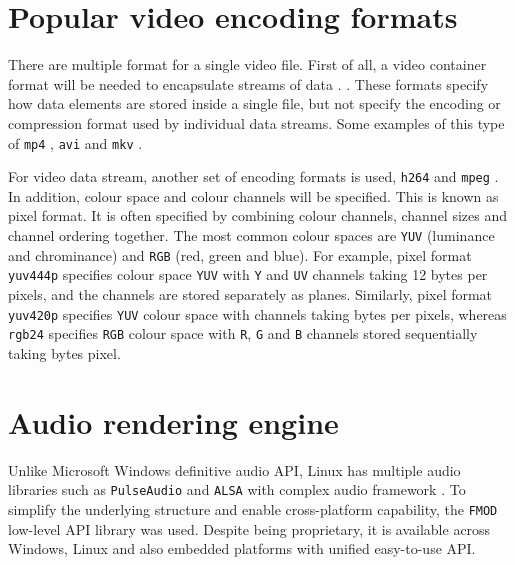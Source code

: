 \section{Popular video encoding formats}

There are multiple format  for a single video file. First of all, a video container format will be needed to encapsulate  streams of  data . . These formats specify how data elements are stored inside a single file, but  not specify the encoding or compression format used by individual data streams. Some examples of this type of   \texttt{mp4} \cite{mp4}, \texttt{avi} \cite{avi} and \texttt{mkv} \cite{mkv}.

For  video data stream, another set of encoding formats is used,  \texttt{h264} \cite{h264} and \texttt{mpeg} \cite{mpeg}. In addition, colour space and colour channels will  be specified. This is known as  pixel format. It is often specified by combining colour channels, channel sizes and channel ordering together. The  most common colour spaces are \texttt{YUV} (luminance and chrominance) and \texttt{RGB} (red, green and blue). For example, pixel format \texttt{yuv444p} specifies colour space \texttt{YUV} with \texttt{Y} and \texttt{UV} channels taking 12 bytes per  pixels, and the channels are stored separately as planes. Similarly, pixel format \texttt{yuv420p} specifies \texttt{YUV} colour space with channels taking  bytes per  pixels, whereas \texttt{rgb24} specifies \texttt{RGB} colour space with \texttt{R}, \texttt{G} and \texttt{B} channels stored sequentially taking  bytes  pixel.

\section{Audio rendering engine}

Unlike Microsoft Windows definitive audio API, Linux has multiple audio libraries such as \texttt{PulseAudio} \cite{developers2013pulseaudio} and \texttt{ALSA} \cite{alsa} with complex audio framework . To simplify the underlying structure and enable cross-platform capability, the \texttt{FMOD} \cite{fmod} low-level API library was used. Despite being proprietary, it is available across Windows, Linux and also  embedded platforms with  unified easy-to-use API.

